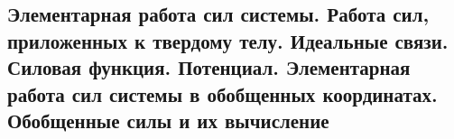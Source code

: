 

\subsection{Элементарная работа сил системы. Работа сил, приложенных к твердому телу. Идеальные связи. Силовая функция. Потенциал. Элементарная работа сил системы в обобщенных координатах. Обобщенные силы и их вычисление}



